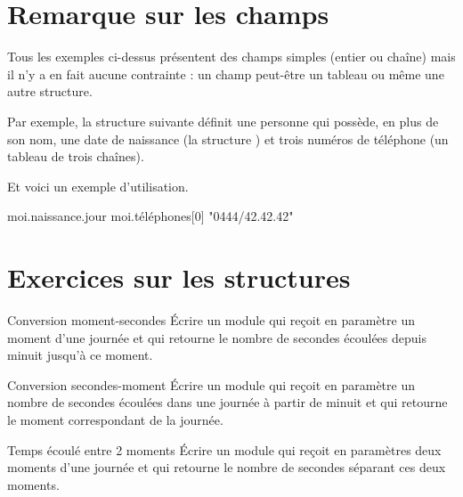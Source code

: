	
	\section{Remarque sur les champs}
	
		Tous les exemples ci-dessus présentent des champs simples
		(entier ou chaîne) 
		mais il n'y a en fait aucune contrainte :
		un champ peut-être un tableau ou même une autre structure.
		
		Par exemple, la structure suivante définit une personne
		qui possède, en plus de son nom,
		une date de naissance (la structure )
		et trois numéros de téléphone (un tableau de trois chaînes).
		
		\begin{LDA}
			\EndStruct
		\end{LDA}
		
		Et voici un exemple d'utilisation.

		\begin{LDA}
			\Decl{moi}{personne}
			\Let moi.naissance.jour \Gets 23
			\Let moi.téléphones[0] \Gets "0444/42.42.42"
		\end{LDA}
		
	\section{Exercices sur les structures}
	
		\begin{Exercice}{Conversion moment-secondes}
			Écrire un module qui reçoit en paramètre un
			moment d’une journée et qui retourne le nombre de secondes écoulées
			depuis minuit jusqu’à ce moment.
		\end{Exercice}
		
		\begin{Exercice}{Conversion secondes-moment}
			Écrire un module qui reçoit en paramètre un
			nombre de secondes écoulées dans une journée à partir de minuit et qui
			retourne le moment correspondant de la journée.
		\end{Exercice}
		
		\begin{Exercice}{Temps écoulé entre 2 moments}
			Écrire un module qui reçoit en paramètres deux
			moments d’une journée et qui retourne le nombre de secondes séparant
			ces deux moments.
		\end{Exercice}
		
